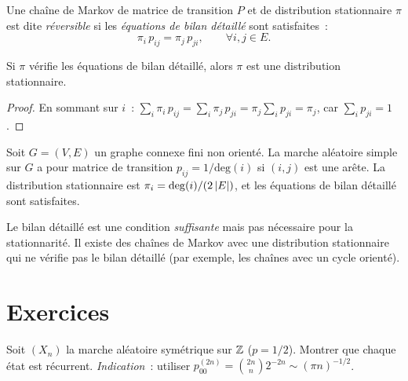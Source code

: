 \begin{definition}[R\'eversibilit\'e]
Une cha\^ine de Markov de matrice de transition $P$ et de distribution stationnaire
$\pi$ est dite \emph{r\'eversible} si les \emph{\'equations de bilan d\'etaill\'e}
sont satisfaites~:
\[
    \pi_i\, p_{ij} = \pi_j\, p_{ji}, \qquad \forall i, j \in E.
\]
\end{definition}

\begin{proposition}
Si $\pi$ v\'erifie les \'equations de bilan d\'etaill\'e, alors $\pi$ est une
distribution stationnaire.
\end{proposition}

\begin{proof}
En sommant sur $i$~:
$\sum_i \pi_i\, p_{ij} = \sum_i \pi_j\, p_{ji} = \pi_j \sum_i p_{ji} = \pi_j$,
car $\sum_i p_{ji} = 1$.
\end{proof}

\begin{exemple}
Soit $G = (V, E)$ un graphe connexe fini non orient\'e. La marche al\'eatoire simple
sur $G$ a pour matrice de transition $p_{ij} = 1/\mathrm{deg}(i)$ si $(i,j)$ est une
ar\^ete. La distribution stationnaire est $\pi_i = \mathrm{deg}(i)/(2\left| E \right|)$, et
les \'equations de bilan d\'etaill\'e sont satisfaites.
\end{exemple}

\begin{attention}[title=\textbf{Bilan d\'etaill\'e $\neq$ stationnarit\'e}]
Le bilan d\'etaill\'e est une condition \emph{suffisante} mais pas n\'ecessaire pour
la stationnarit\'e. Il existe des cha\^ines de Markov avec une distribution
stationnaire qui ne v\'erifie pas le bilan d\'etaill\'e (par exemple, les cha\^ines
avec un cycle orient\'e).
\end{attention}

\section{Exercices}

\begin{exercice}
Soit $(X_n)$ la marche al\'eatoire sym\'etrique sur $\mathbb{Z}$ ($p = 1/2$).
Montrer que chaque \'etat est r\'ecurrent.
\emph{Indication}~: utiliser $p_{00}^{(2n)} = \binom{2n}{n} 2^{-2n} \sim (\pi n)^{-1/2}$.
\end{exercice}

